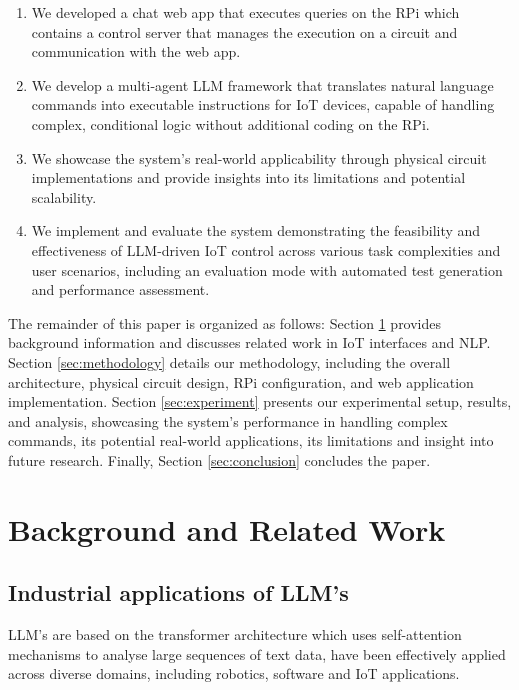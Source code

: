 \documentclass[lettersize,journal]{IEEEtran}
\begin{document}
\begin{enumerate}
\item We developed a chat web app that executes queries on the RPi which contains a control server that manages the execution on a circuit and communication with the web app.
\newpage
\item We develop a multi-agent LLM framework that translates natural language commands into executable instructions for IoT devices, capable of handling complex, conditional logic without additional coding on the RPi.
\item We showcase the system's real-world applicability through physical circuit implementations and provide insights into its limitations and potential scalability.
\item We implement and evaluate the system demonstrating the feasibility and effectiveness of LLM-driven IoT control across various task complexities and user scenarios, including an evaluation mode with automated test generation and performance assessment.
\end{enumerate}

The remainder of this paper is organized as follows: Section \ref{sec:background} provides background information and discusses related work in IoT interfaces and NLP. Section \ref{sec:methodology} details our methodology, including the overall architecture, physical circuit design, RPi configuration, and web application implementation. Section \ref{sec:experiment} presents our experimental setup, results, and analysis, showcasing the system's performance in handling complex commands, its potential real-world applications, its limitations and insight into future research. Finally, Section \ref{sec:conclusion} concludes the paper.



\section{Background and Related Work}\label{sec:background}

\subsection{Industrial applications of LLM's}
LLM's are based on the transformer architecture \cite{DBLP:journals/corr/VaswaniSPUJGKP17} which uses self-attention mechanisms to analyse large sequences of text data, have been effectively applied across diverse domains, including robotics, software and IoT applications. 
\end{document}
